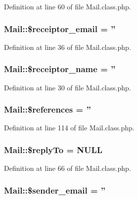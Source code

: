 Definition at line 60 of file Mail.\-class.\-php.

\hypertarget{classMail_aa034785886f8bdcf3a5ed9c86ce8ed14}{
\subsubsection[{\$receiptor\-\_\-email}]{\setlength{\rightskip}{0pt plus 5cm}Mail\-::\$receiptor\-\_\-email = ''}}\label{classMail_aa034785886f8bdcf3a5ed9c86ce8ed14}


Definition at line 36 of file Mail.\-class.\-php.

\hypertarget{classMail_a44df4937f3c8b2691e9bbb1220c667f3}{
\subsubsection[{\$receiptor\-\_\-name}]{\setlength{\rightskip}{0pt plus 5cm}Mail\-::\$receiptor\-\_\-name = ''}}\label{classMail_a44df4937f3c8b2691e9bbb1220c667f3}


Definition at line 30 of file Mail.\-class.\-php.

\hypertarget{classMail_abcd438320caac44b166df90ba9092fe9}{
\subsubsection[{\$references}]{\setlength{\rightskip}{0pt plus 5cm}Mail\-::\$references = ''}}\label{classMail_abcd438320caac44b166df90ba9092fe9}


Definition at line 114 of file Mail.\-class.\-php.

\hypertarget{classMail_a55788852017ccc1716af69cdde26df99}{
\subsubsection[{\$reply\-To}]{\setlength{\rightskip}{0pt plus 5cm}Mail\-::\$reply\-To = N\-U\-L\-L}}\label{classMail_a55788852017ccc1716af69cdde26df99}


Definition at line 66 of file Mail.\-class.\-php.

\hypertarget{classMail_a94dccbbdc161e818d90e41ad197ebe85}{
\subsubsection[{\$sender\-\_\-email}]{\setlength{\rightskip}{0pt plus 5cm}Mail\-::\$sender\-\_\-email = ''}}\label{classMail_a94dccbbdc161e818d90e41ad197ebe85}


